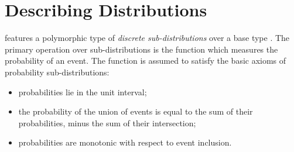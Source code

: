 %
%
%
%
%
%
%

\section{Describing Distributions\label{sec:distributions}}

\EC features a polymorphic type  of \emph{discrete
sub-distributions} over a base type . The primary operation over
sub-distributions is the function  which measures the probability of an event. The function is assumed to
satisfy the basic axioms of probability sub-distributions:
\begin{itemize}
\item probabilities lie in the unit interval;
\item the probability of the union of events is equal to the sum of
  their probabilities, minus the sum of their intersection;
\item probabilities are monotonic with respect to event inclusion.
\end{itemize}

